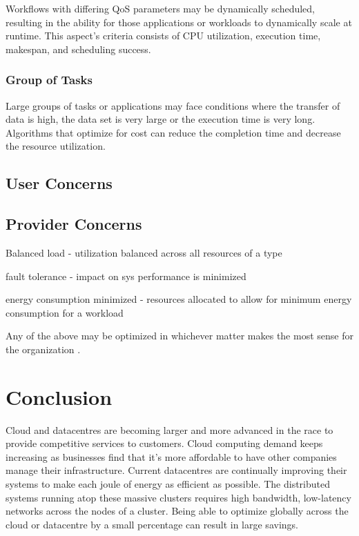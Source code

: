 \documentclass[12pt]{article}
\begin{document}
Workflows with differing QoS parameters may be dynamically scheduled, resulting in the ability for those applications or workloads to dynamically scale at runtime. This aspect's criteria consists of CPU utilization, execution time, makespan, and scheduling success.

\subsubsection*{Group of Tasks}

Large groups of tasks or applications may face conditions where the transfer of data is high, the data set is very large or the execution time is very long. Algorithms that optimize for cost can reduce the completion time and decrease the resource utilization.


\subsection{User Concerns}






\subsection{Provider Concerns} \label{provider-concerns}



Balanced load - utilization balanced across all resources of a type

fault tolerance - impact on sys performance is minimized

energy consumption minimized - resources allocated to allow for minimum energy consumption for a workload

Any of the above may be optimized in whichever matter makes the most sense for the organization \cite{Jennings2015}.




\section{Conclusion} \label{sec:conclusion}

Cloud and datacentres are becoming larger and more advanced in the race to provide competitive services to customers. Cloud computing demand keeps increasing as businesses find that it's more affordable to have other companies manage their infrastructure. Current datacentres are continually improving their systems to make each joule of energy as efficient as possible. The distributed systems running atop these massive clusters requires high bandwidth, low-latency networks across the nodes of a cluster. Being able to optimize globally across the cloud or datacentre by a small percentage can result in large savings.


\printbibliography
\end{document}
